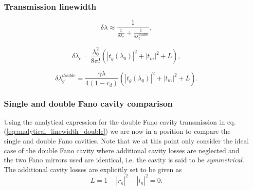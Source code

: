 \subsubsection{Transmission linewidth}

\begin{equation}
    \delta \lambda \approx \frac{1}{\frac{1}{\delta \lambda_c} + \frac{1}{\delta \lambda_g^{double}}},
    \label{eq:analytical_linewidth_double}
\end{equation}

\begin{equation}
    \delta \lambda_c = \frac{\lambda_0^2}{8 \pi l} (|t_g(\lambda_0)|^2 + |t_m|^2 + L),
\end{equation}

\begin{equation}
    \delta \lambda_g^{double} = \frac{\gamma \lambda}{4 (1-r_d)}(|t_g(\lambda_0)|^2 + |t_m|^2 + L).
    \label{eq:double_fano_linewidth_contribution}
\end{equation}

\subsubsection{Single and double Fano cavity comparison}

Using the analytical expression for the double Fano cavity transmission in eq. (\ref{eq:analytical_linewidth_double}) we are now in a position to compare the single and double Fano cavities. Note that we at this point only consider the ideal case of the double Fano cavity where additional cavity losses are neglected and the two Fano mirrors used are identical, i.e. the cavity is said to be \emph{symmetrical}. The additional cavity losses are explicitly set to be given as
\begin{equation}
    L = 1-|r_g|^2-|t_g|^2 = 0.
\end{equation}

